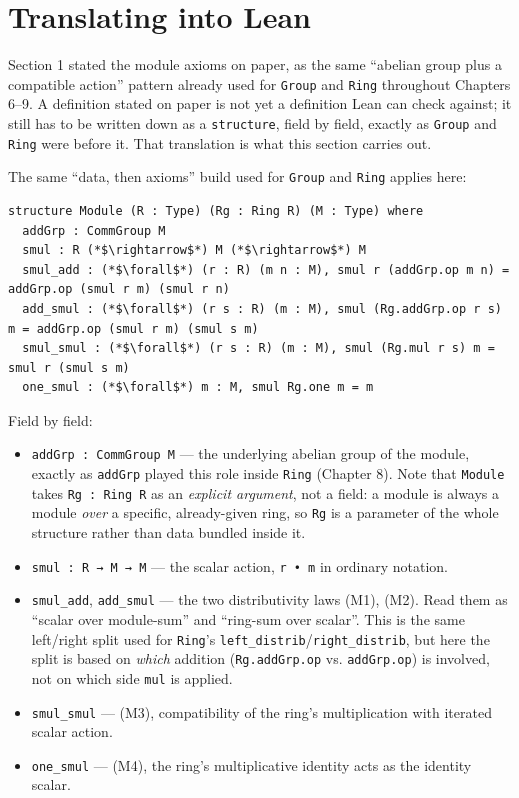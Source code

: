 \section{Translating into Lean}\label{sec:10-modules:02-translating-into-lean:1}

Section 1 stated the module axioms on paper, as the same ``abelian group plus a compatible action'' pattern already used for \texttt{Group} and \texttt{Ring} throughout Chapters 6--9. A definition stated on paper is not yet a definition Lean can check against; it still has to be written down as a \texttt{structure}, field by field, exactly as \texttt{Group} and \texttt{Ring} were before it. That translation is what this section carries out.

The same ``data, then axioms'' build used for \texttt{Group} and \texttt{Ring} applies here:

\begin{lstlisting}
structure Module (R : Type) (Rg : Ring R) (M : Type) where
  addGrp : CommGroup M
  smul : R (*$\rightarrow$*) M (*$\rightarrow$*) M
  smul_add : (*$\forall$*) (r : R) (m n : M), smul r (addGrp.op m n) = addGrp.op (smul r m) (smul r n)
  add_smul : (*$\forall$*) (r s : R) (m : M), smul (Rg.addGrp.op r s) m = addGrp.op (smul r m) (smul s m)
  smul_smul : (*$\forall$*) (r s : R) (m : M), smul (Rg.mul r s) m = smul r (smul s m)
  one_smul : (*$\forall$*) m : M, smul Rg.one m = m
\end{lstlisting}

Field by field:

\begin{itemize}
\tightlist
\item
  \texttt{addGrp : CommGroup M} --- the underlying abelian group of the module, exactly as \texttt{addGrp} played this role inside \texttt{Ring} (Chapter 8). Note that \texttt{Module} takes \texttt{Rg : Ring R} as an \emph{explicit argument}, not a field: a module is always a module \emph{over} a specific, already-given ring, so \texttt{Rg} is a parameter of the whole structure rather than data bundled inside it.
\item
  \texttt{smul : R → M → M} --- the scalar action, \texttt{r • m} in ordinary notation.
\item
  \texttt{smul\_\allowbreak{}add}, \texttt{add\_\allowbreak{}smul} --- the two distributivity laws (M1), (M2). Read them as ``scalar over module-sum'' and ``ring-sum over scalar''. This is the same left/right split used for \texttt{Ring}'s \texttt{left\_\allowbreak{}distrib}/\texttt{right\_\allowbreak{}distrib}, but here the split is based on \emph{which} addition (\texttt{Rg.addGrp.op} vs. \texttt{addGrp.op}) is involved, not on which side \texttt{mul} is applied.
\item
  \texttt{smul\_\allowbreak{}smul} --- (M3), compatibility of the ring's multiplication with iterated scalar action.
\item
  \texttt{one\_\allowbreak{}smul} --- (M4), the ring's multiplicative identity acts as the identity scalar.
\end{itemize}

